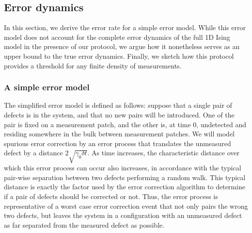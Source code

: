 \documentclass[twocolumn,superscriptaddress,aps,prb,floatfix]{revtex4-1}
\begin{document}
 
 \subsection{Error dynamics}
  
  In this section, we derive the error rate for a simple error model.  While this error model does not account for the complete error dynamics of the full 1D Ising model in the presence of our protocol, we argue how it nonetheless serves as an upper bound to the true error dynamics.  Finally, we sketch how this protocol provides a threshold for any finite density of measurements.
 
 \subsubsection{A simple error model}
 \label{sec:threshold}
 
 The simplified error model is defined as follows:  suppose that a single pair of defects is in the system, and that no new pairs will be introduced.  One of the pair is fixed on a measurement patch, and the other is, at time 0, undetected and residing somewhere in the bulk between measurement patches.  We will model spurious error correction by an error process that translates the unmeasured defect by a distance $2\sqrt{\gamma_0 \delta t}$.  As time increases, the characteristic distance over which this error process can occur also increases, in accordance with the typical pair-wise separation between two defects performing a random walk.  This typical distance is exactly the factor used by the error correction algorithm to determine if a pair of defects should be corrected or not.  Thus, the error process is representative of a worst case error correction event that not only pairs the wrong two defects, but leaves the system in a configuration with an unmeasured defect as far separated from the measured defect as possible.
 
\end{document}
